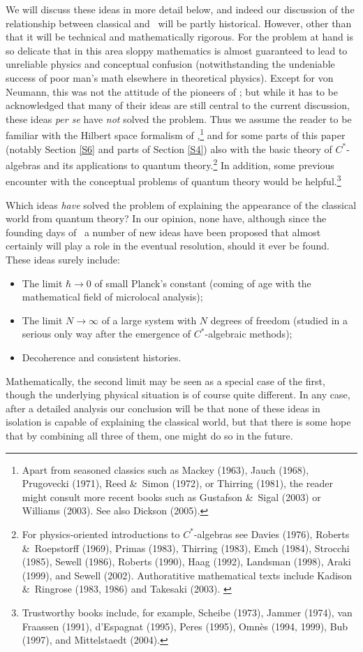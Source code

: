 \documentclass[12pt]{article}
\newcommand{\ca}{$C^*$-algebra} \newcommand{\jba}{JB-algebra}
\newcommand{\raw}{\rightarrow} \newcommand{\rat}{\mapsto}
\begin{document}
We will discuss these ideas in more detail below, and indeed our discussion of the relationship between classical and \qm\ will be partly historical. However, other than that it will be technical and mathematically rigorous. For the problem at hand is so delicate that in this area sloppy mathematics is almost guaranteed to lead to unreliable physics and conceptual confusion (notwithstanding the undeniable success of poor man's math elsewhere in theoretical physics). Except for von Neumann, this was not the attitude of the pioneers of \qm; but while it has to be acknowledged that many of their ideas are still central to the current discussion, these ideas {\it per se} have {\it not} solved the problem. Thus we assume the reader to be familiar with the Hilbert space formalism of \qm,\footnote{
Apart from seasoned classics such as Mackey (1963), Jauch (1968), Prugovecki (1971), Reed \&\ Simon (1972), or Thirring (1981), the reader might consult more recent books such as Gustafson \&\ Sigal (2003) or  Williams (2003). See also Dickson (2005).} 
and for some parts of this paper (notably Section \ref{S6} and parts of Section \ref{S4}) also with the basic theory of \ca s and its applications to quantum theory.\footnote{For physics-oriented introductions to \ca s see Davies (1976), Roberts \&\ Roepstorff (1969), Primas (1983), Thirring (1983), Emch (1984), Strocchi (1985), Sewell (1986), Roberts (1990), Haag (1992), Landsman (1998), Araki (1999), and Sewell (2002).  Authoratitive mathematical texts include Kadison \&\ Ringrose (1983, 1986) and Takesaki (2003). \label{Cstarlit}} In addition, some previous encounter with the conceptual problems of quantum theory would be helpful.\footnote{Trustworthy books include, for example,  
Scheibe (1973), Jammer (1974), van Fraassen (1991), d'Espagnat (1995), Peres (1995), 
Omn\`{e}s (1994, 1999), Bub (1997), and Mittelstaedt  (2004).\label{QMtexts}}

Which ideas {\it have} solved the problem of explaining the appearance of the classical world from quantum theory? In our opinion, none have, although since the founding days of \qm\ a number of new ideas have been proposed that almost certainly will play a role in the eventual resolution, should it ever be found. These ideas surely include:
\begin{itemize}
\item 
The limit $\hbar\rightarrow 0$ of small Planck's constant (coming of age with the mathematical field of microlocal analysis);
\item The limit $N\raw\infty$ of a large system with $N$ degrees of freedom (studied in a serious only way after the emergence of \ca ic methods);
\item 
Decoherence and consistent histories. 
\end{itemize}
Mathematically, the second limit may be seen as a special case of the first, though the underlying physical situation is of course quite different. In any case, after a detailed analysis our 
conclusion will be that none of these ideas in isolation is capable of explaining the classical world, but that there is some hope that by combining all three of them, one might do so in the future. 
\end{document}
